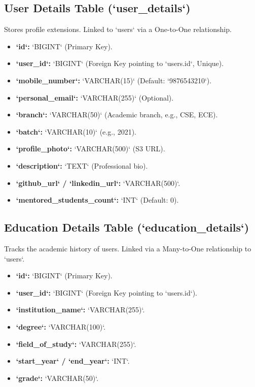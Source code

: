 \subsection{User Details Table (`user\_details`)}
Stores profile extensions. Linked to `users` via a One-to-One relationship.
\begin{itemize}
    \item \textbf{`id`:} `BIGINT` (Primary Key).
    \item \textbf{`user\_id`:} `BIGINT` (Foreign Key pointing to `users.id`, Unique).
    \item \textbf{`mobile\_number`:} `VARCHAR(15)` (Default: `9876543210`).
    \item \textbf{`personal\_email`:} `VARCHAR(255)` (Optional).
    \item \textbf{`branch`:} `VARCHAR(50)` (Academic branch, e.g., CSE, ECE).
    \item \textbf{`batch`:} `VARCHAR(10)` (e.g., 2021).
    \item \textbf{`profile\_photo`:} `VARCHAR(500)` (S3 URL).
    \item \textbf{`description`:} `TEXT` (Professional bio).
    \item \textbf{`github\_url` / `linkedin\_url`:} `VARCHAR(500)`.
    \item \textbf{`mentored\_students\_count`:} `INT` (Default: 0).
\end{itemize}

\subsection{Education Details Table (`education\_details`)}
Tracks the academic history of users. Linked via a Many-to-One relationship to `users`.
\begin{itemize}
    \item \textbf{`id`:} `BIGINT` (Primary Key).
    \item \textbf{`user\_id`:} `BIGINT` (Foreign Key pointing to `users.id`).
    \item \textbf{`institution\_name`:} `VARCHAR(255)`.
    \item \textbf{`degree`:} `VARCHAR(100)`.
    \item \textbf{`field\_of\_study`:} `VARCHAR(255)`.
    \item \textbf{`start\_year` / `end\_year`:} `INT`.
    \item \textbf{`grade`:} `VARCHAR(50)`.
\end{itemize}

